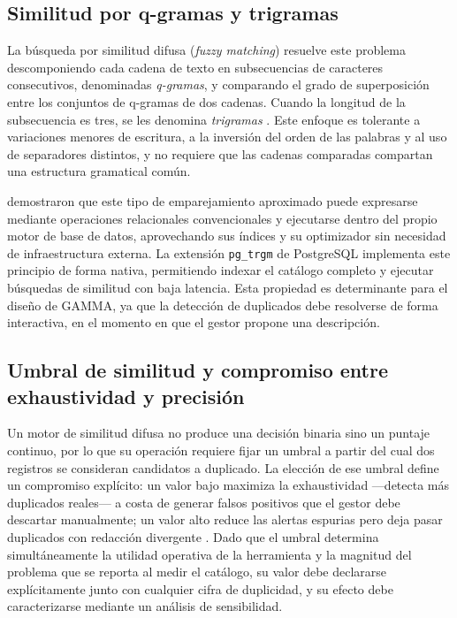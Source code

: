 \subsection{Similitud por q-gramas y trigramas}
La búsqueda por similitud difusa (\textit{fuzzy matching}) resuelve este problema descomponiendo cada cadena de texto en subsecuencias de caracteres consecutivos, denominadas \textit{q-gramas}, y comparando el grado de superposición entre los conjuntos de q-gramas de dos cadenas. Cuando la longitud de la subsecuencia es tres, se les denomina \textit{trigramas} \cite{postgresql2023}. Este enfoque es tolerante a variaciones menores de escritura, a la inversión del orden de las palabras y al uso de separadores distintos, y no requiere que las cadenas comparadas compartan una estructura gramatical común.

 demostraron que este tipo de emparejamiento aproximado puede expresarse mediante operaciones relacionales convencionales y ejecutarse dentro del propio motor de base de datos, aprovechando sus índices y su optimizador sin necesidad de infraestructura externa. La extensión \texttt{pg\_trgm} de PostgreSQL \cite{postgresql2023} implementa este principio de forma nativa, permitiendo indexar el catálogo completo y ejecutar búsquedas de similitud con baja latencia. Esta propiedad es determinante para el diseño de GAMMA, ya que la detección de duplicados debe resolverse de forma interactiva, en el momento en que el gestor propone una descripción.

\subsection{Umbral de similitud y compromiso entre exhaustividad y precisión}
Un motor de similitud difusa no produce una decisión binaria sino un puntaje continuo, por lo que su operación requiere fijar un umbral a partir del cual dos registros se consideran candidatos a duplicado. La elección de ese umbral define un compromiso explícito: un valor bajo maximiza la exhaustividad —detecta más duplicados reales— a costa de generar falsos positivos que el gestor debe descartar manualmente; un valor alto reduce las alertas espurias pero deja pasar duplicados con redacción divergente \cite{elmagarmid2007}. Dado que el umbral determina simultáneamente la utilidad operativa de la herramienta y la magnitud del problema que se reporta al medir el catálogo, su valor debe declararse explícitamente junto con cualquier cifra de duplicidad, y su efecto debe caracterizarse mediante un análisis de sensibilidad.

